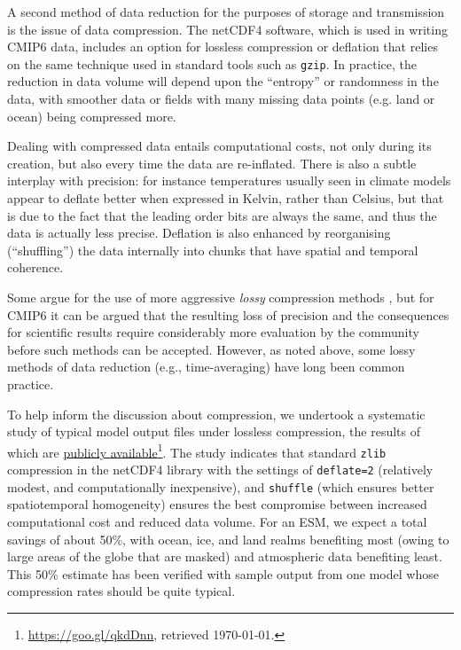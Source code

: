 \documentclass[gmd,manuscript]{copernicus}
\newcommand{\urlref}[2] {\href{#1}{#2}\footnote{\url{#1}, retrieved \today.}}
\begin{document}
A second method of data reduction for the purposes of storage and
transmission is the issue of data compression. The netCDF4 software, which is 
used in writing CMIP6 data, includes an option for lossless
compression or deflation \citep{ref:zivlempel1977} that relies on the
same technique used in standard tools such as \texttt{gzip}. In
practice, the reduction in data volume will depend upon the
``entropy'' or randomness in the data, with smoother data or fields
with many missing data points (e.g. land or ocean) being
compressed more.

Dealing with compressed data entails computational costs, not only during 
its creation, but also every time the data are re-inflated. There
is also a subtle interplay with precision: for instance temperatures
usually seen in climate models appear to deflate better when expressed
in Kelvin, rather than Celsius, but that is due to the fact that the
leading order bits are always the same, and thus the data is actually
less precise. Deflation is also enhanced by reorganising
(``shuffling'') the data internally into chunks that have spatial and
temporal coherence.

Some argue for the use of more aggressive
\emph{lossy} compression methods \citep{ref:bakeretal2016}, but 
for CMIP6 it can be argued that the resulting loss of precision
 and the consequences for scientific results
require considerably more evaluation by the community before such
methods can be accepted. However, as noted above,
some lossy methods of data reduction (e.g., time-averaging) have long
been common practice.

To help inform the discussion about compression, we undertook a systematic study of 
typical model output files under lossless compression, the
results of which are \urlref{https://goo.gl/qkdDnn}{publicly available}.
The study indicates that standard \texttt{zlib} compression in the
netCDF4 library with the settings of \texttt{deflate=2} (relatively
modest, and computationally inexpensive), and \texttt{shuffle} (which
ensures better spatiotemporal homogeneity) ensures the best compromise
between increased computational cost and reduced data volume. For an
ESM,
we expect a total savings of about 50\%, with ocean, ice, and land realms
benefiting most (owing to large areas of the globe that are
masked) and atmospheric data benefiting least. This 50\% estimate has been
verified with sample output from one model whose compression rates should be quite typical.
\end{document}
